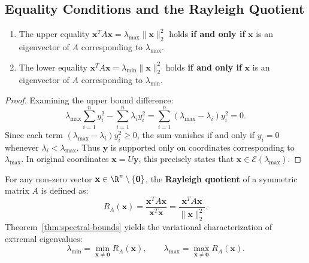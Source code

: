 \subsection{Equality Conditions and the Rayleigh Quotient}

\begin{property}
\mbox{}\par\nopagebreak
\begin{enumerate}
    \item The upper equality $\mathbf{x}^T A \mathbf{x} = \lambda_{\max} \|\mathbf{x}\|_2^2$ holds \textbf{if and only if} $\mathbf{x}$ is an eigenvector of $A$ corresponding to $\lambda_{\max}$.
    \item The lower equality $\mathbf{x}^T A \mathbf{x} = \lambda_{\min} \|\mathbf{x}\|_2^2$ holds \textbf{if and only if} $\mathbf{x}$ is an eigenvector of $A$ corresponding to $\lambda_{\min}$.
\end{enumerate}
\end{property}

\begin{proof}
Examining the upper bound difference:
\begin{equation}
    \lambda_{\max} \sum_{i=1}^n y_i^2 - \sum_{i=1}^n \lambda_i y_i^2 = \sum_{i=1}^n (\lambda_{\max} - \lambda_i) y_i^2 = 0.
\end{equation}
Since each term $(\lambda_{\max} - \lambda_i) y_i^2 \ge 0$, the sum vanishes if and only if $y_i = 0$ whenever $\lambda_i < \lambda_{\max}$. Thus $\mathbf{y}$ is supported only on coordinates corresponding to $\lambda_{\max}$. In original coordinates $\mathbf{x} = U\mathbf{y}$, this precisely states that $\mathbf{x} \in \mathcal{E}(\lambda_{\max})$.
\end{proof}

\begin{definition}
For any non-zero vector $\mathbf{x} \in \R^n \setminus \{\mathbf{0}\}$, the \textbf{Rayleigh quotient} of a symmetric matrix $A$ is defined as:
\begin{equation}
    R_A(\mathbf{x}) = \frac{\mathbf{x}^T A \mathbf{x}}{\mathbf{x}^T \mathbf{x}} = \frac{\mathbf{x}^T A \mathbf{x}}{\|\mathbf{x}\|_2^2}.
\end{equation}
Theorem~\ref{thm:spectral-bounds} yields the variational characterization of extremal eigenvalues:
\begin{equation}
    \lambda_{\min} = \min_{\mathbf{x} \neq \mathbf{0}} R_A(\mathbf{x}), \qquad \lambda_{\max} = \max_{\mathbf{x} \neq \mathbf{0}} R_A(\mathbf{x}).
\end{equation}
\end{definition}

